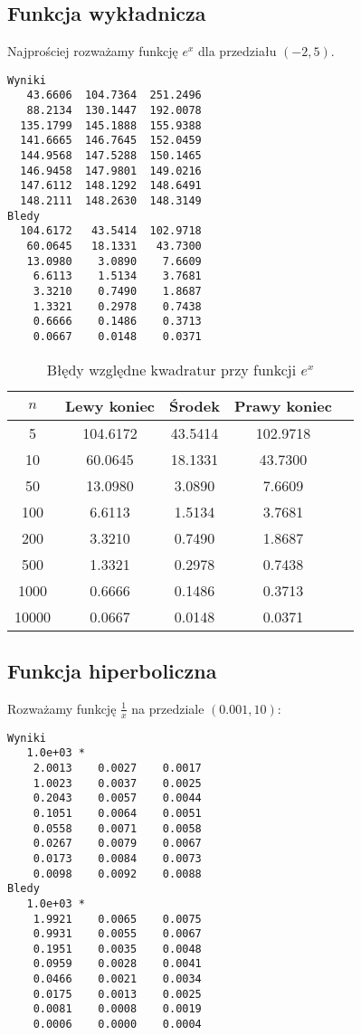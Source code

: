 \documentclass[12pt]{article}
\begin{document}
\newpage
\subsection{Funkcja wykładnicza}

Najprościej rozważamy funkcję $e^x$ dla przedziału $(-2, 5)$.

\begin{lstlisting}
Wyniki
   43.6606  104.7364  251.2496
   88.2134  130.1447  192.0078
  135.1799  145.1888  155.9388
  141.6665  146.7645  152.0459
  144.9568  147.5288  150.1465
  146.9458  147.9801  149.0216
  147.6112  148.1292  148.6491
  148.2111  148.2630  148.3149
Bledy
  104.6172   43.5414  102.9718
   60.0645   18.1331   43.7300
   13.0980    3.0890    7.6609
    6.6113    1.5134    3.7681
    3.3210    0.7490    1.8687
    1.3321    0.2978    0.7438
    0.6666    0.1486    0.3713
    0.0667    0.0148    0.0371
\end{lstlisting}

\begin{table}[h!]
\caption{\footnotesize Błędy względne kwadratur przy funkcji $e^x$} %
\renewcommand{\arraystretch}{1.1}
\centering\begin{tabular}{|c|c|c|c|c|}
\hline $n$ & Lewy koniec & Środek & Prawy koniec \\
\hline      5 & 104.6172 & 43.5414 & 102.9718 \\
\hline     10 & 60.0645 & 18.1331 & 43.7300 \\
\hline     50 & 13.0980 & 3.0890 & 7.6609 \\
\hline    100 & 6.6113 & 1.5134 & 3.7681 \\
\hline    200 & 3.3210 & 0.7490 & 1.8687 \\
\hline    500 & 1.3321 & 0.2978 & 0.7438 \\
\hline   1000 & 0.6666 & 0.1486 & 0.3713 \\
\hline  10000 & 0.0667 & 0.0148 & 0.0371 \\
\hline
\end{tabular}
\label{Tabela z wynikami 4}
\end{table}

\newpage
\subsection{Funkcja hiperboliczna}

Rozważamy funkcję $\frac{1}{x}$ na przedziale $(0.001, 10)$:

\begin{lstlisting}
Wyniki
   1.0e+03 *
    2.0013    0.0027    0.0017
    1.0023    0.0037    0.0025
    0.2043    0.0057    0.0044
    0.1051    0.0064    0.0051
    0.0558    0.0071    0.0058
    0.0267    0.0079    0.0067
    0.0173    0.0084    0.0073
    0.0098    0.0092    0.0088
Bledy
   1.0e+03 *
    1.9921    0.0065    0.0075
    0.9931    0.0055    0.0067
    0.1951    0.0035    0.0048
    0.0959    0.0028    0.0041
    0.0466    0.0021    0.0034
    0.0175    0.0013    0.0025
    0.0081    0.0008    0.0019
    0.0006    0.0000    0.0004
\end{lstlisting}
\end{document}
